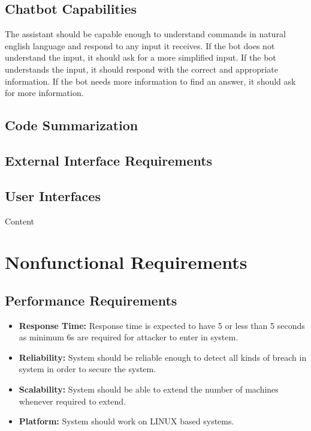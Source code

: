 \documentclass[oneside,a4paper,12pt, times]{book}
\begin{document}
\subsection {Chatbot Capabilities}
\-\hspace{0.5in} The assistant should be capable enough to understand commands in natural english language and  respond to any input it receives. If the bot does not understand the input, it should ask for a more simplified input. If the bot understands the input, it should respond with the correct and appropriate  information. If the bot needs more information to find an answer, it should ask for more information. 

\subsection{Code Summarization}
\-\hspace{0.5in}



\subsection{External Interface Requirements }  
\subsection{User Interfaces}
Content










\section{Nonfunctional Requirements } 

\subsection{Performance Requirements}
\begin{itemize}
    \item
    \textbf{Response Time:} 
        Response time is expected to have 5 or less than 5 seconds as minimum 6s are required for attacker to enter in system.
    \item
    \textbf{Reliability:} 
	    System should be reliable enough to detect all kinds of breach in system in order to secure  the system.
    \item
    \textbf{Scalability:} 
		System should be able to extend the number of machines whenever required to extend.
    \item
    \textbf{Platform:} 
	    System should work on LINUX based systems.
\end{itemize}
\end{document}
